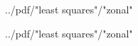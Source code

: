 \documentclass[10pt]{newsiambook}
\newcommand{\pathgraphics}{../pdf/}
\begin{document}
\begin{overpic}[ scale = 0.70, grid, tics = 10 ]
	{\pathgraphics "least squares"/"zonal"}
\end{overpic}

\break
\clearpage
\begin{overpic}[ scale = 0.70, grid, tics = 10 ]
	{\pathgraphics "least squares"/"zonal"}
\end{overpic}
\end{document}

